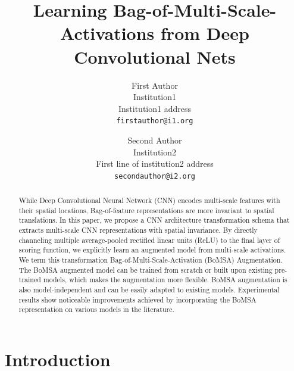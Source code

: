 \documentclass[10pt,twocolumn,letterpaper]{article}
\begin{document}
\title{Learning Bag-of-Multi-Scale-Activations from Deep Convolutional Nets}

\author{First Author\\
Institution1\\
Institution1 address\\
{\tt\small firstauthor@i1.org}
\and
Second Author\\
Institution2\\
First line of institution2 address\\
{\tt\small secondauthor@i2.org}
}

\maketitle

\begin{abstract}
While Deep Convolutional Neural Network (CNN) encodes multi-scale features with their spatial locations, Bag-of-feature representations are more invariant to spatial translations. In this paper, we propose a CNN architecture transformation schema that extracts multi-scale CNN representations with spatial invariance. By directly channeling multiple average-pooled rectified linear units (ReLU) to the final layer of scoring function, we explicitly learn an augmented model from multi-scale activations. We term this transformation Bag-of-Multi-Scale-Activation (BoMSA) Augmentation. The BoMSA augmented model can be trained from scratch or built upon existing pre-trained models, which makes the augmentation more flexible. BoMSA augmentation is also model-independent and can be easily adapted to existing models. Experimental results show noticeable improvements achieved by incorporating the BoMSA representation on various models in the literature.  

\end{abstract}

\section{Introduction}
\end{document}
